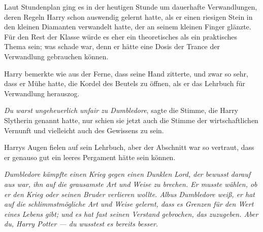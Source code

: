Laut Stundenplan ging es in der heutigen Stunde um dauerhafte Verwandlungen, deren Regeln Harry schon auswendig gelernt hatte, als er einen riesigen Stein in den kleinen Diamanten verwandelt hatte, der an seinem kleinen Finger glänzte. Für den Rest der Klasse würde es eher ein theoretisches als ein praktisches Thema sein; was schade war, denn er hätte eine Dosis der Trance der Verwandlung gebrauchen können.

Harry bemerkte wie aus der Ferne, dass seine Hand zitterte, und zwar so sehr, dass er Mühe hatte, die Kordel des Beutels zu öffnen, als er das Lehrbuch für Verwandlung herauszog.

\emph{Du warst ungeheuerlich unfair zu Dumbledore}, sagte die Stimme, die Harry Slytherin genannt hatte, nur schien sie jetzt auch die Stimme der wirtschaftlichen Vernunft und vielleicht auch des Gewissens zu sein.

Harrys Augen fielen auf sein Lehrbuch, aber der Abschnitt war so vertraut, dass er genauso gut ein leeres Pergament hätte sein können.

\emph{Dumbledore kämpfte einen Krieg gegen einen Dunklen Lord, der bewusst darauf aus war, ihn auf die grausamste Art und Weise zu brechen. Er musste wählen, ob er den Krieg oder seinen Bruder verlieren wollte. Albus Dumbledore weiß, er hat auf die schlimmstmögliche Art und Weise gelernt, dass es Grenzen für den Wert eines Lebens gibt; und es hat fast seinen Verstand gebrochen, das zuzugeben. Aber du, Harry Potter — \emph{du} wusstest es bereits besser.}

